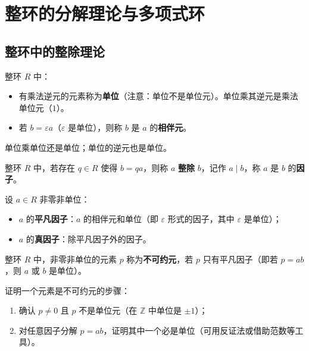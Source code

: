 \chapter{整环的分解理论与多项式环}

\section{整环中的整除理论}

\begin{definition}[单位与相伴元]
整环 $R$ 中：
\begin{itemize}
  \item 有乘法逆元的元素称为\textbf{单位}（注意：单位不是单位元）。单位乘其逆元是乘法单位元（$1$）。
  \item 若 $b = \varepsilon a$（$\varepsilon$ 是单位），则称 $b$ 是 $a$ 的\textbf{相伴元}。
\end{itemize}
\end{definition}

\begin{theorem}[定理 1：单位的运算封闭性]
单位乘单位还是单位；单位的逆元也是单位。
\end{theorem}

\begin{definition}[整除与因子]
整环 $R$ 中，若存在 $q \in R$ 使得 $b = qa$，则称 $a$ \textbf{整除} $b$，记作 $a \mid b$，称 $a$ 是 $b$ 的\textbf{因子}。
\end{definition}

\begin{definition}[平凡因子与真因子]
设 $a \in R$ 非零非单位：
\begin{itemize}
  \item $a$ 的\textbf{平凡因子}：$a$ 的相伴元和单位（即 $\varepsilon$ 形式的因子，其中 $\varepsilon$ 是单位）；
  \item $a$ 的\textbf{真因子}：除平凡因子外的因子。
\end{itemize}
\end{definition}

\begin{definition}[不可约元]
整环 $R$ 中，非零非单位的元素 $p$ 称为\textbf{不可约元}，若 $p$ 只有平凡因子（即若 $p = ab$，则 $a$ 或 $b$ 是单位）。
\end{definition}

\begin{note}
证明一个元素是不可约元的步骤：
\begin{enumerate}
  \item 确认 $p \ne 0$ 且 $p$ 不是单位元（在 $\mathbb{Z}$ 中单位是 $\pm 1$）；
  \item 对任意因子分解 $p = ab$，证明其中一个必是单位（可用反证法或借助范数等工具）。
\end{enumerate}
\end{note}

